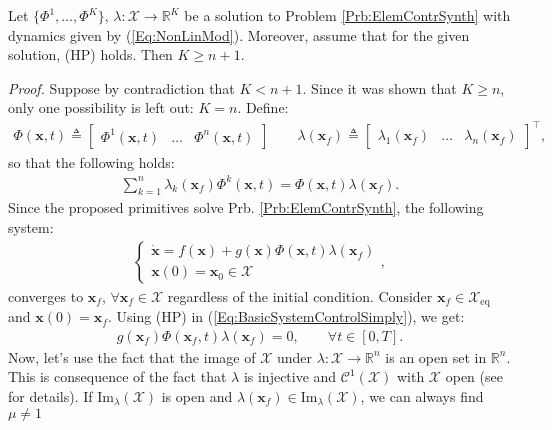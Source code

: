 \documentclass{svmult}
\newcommand{\x}{\mathbf {x}}
\newcommand{\ProofBegin}{{\em Proof.} }
\begin{document}
\begin{theorem} \label{Th:MinNumPrimNonLin}
Let $\{\Phi^1, \dots, \Phi^K\}$, $\lambda: \mathcal X \rightarrow
\mathbb R^K$ be a solution to Problem
\ref{Prb:ElemContrSynth} with dynamics given by
(\ref{Eq:NonLinMod}). Moreover, assume that for the
given solution, (HP) holds. Then $K \geq n+1$.
\end{theorem}

\ProofBegin Suppose by contradiction that $K < n + 1$. Since it was
shown that $K \geq n$, only one possibility is left out:
$K=n$. Define:
\begin{eqnarray}
\varPhi(\x, t) \triangleq \begin{bmatrix} \Phi^1(\x, t) & \dots &
\Phi^n(\x, t) \end{bmatrix} \qquad \lambda(\x_f) \triangleq \begin{bmatrix} \lambda_1(\x_f) & \dots &
\lambda_n(\x_f) \end{bmatrix}^\top,
\end{eqnarray}
so that the following holds:
\begin{eqnarray}
\sum_{k=1}^n \lambda_k(\x_f) \Phi^k(\x, t) = \varPhi(\x, t)
\lambda(\x_f).
\end{eqnarray}
Since the proposed primitives solve Prb.
\ref{Prb:ElemContrSynth}, the following system:
\begin{eqnarray} \label{Eq:BasicSystemControlSimply}
\left\{ \begin{array} {l} \mathbf {\dot x} = f (\mathbf x) +
g(\mathbf x) \varPhi(\x, t) \lambda(\x_f) \\
\mathbf x(0) = \x_0 \in \mathcal X
\end{array} \right. ,
\end{eqnarray}
converges to $\mathbf x_f$, $\forall \x_f \in \mathcal X$
regardless of the initial condition. Consider $\x_f \in \mathcal
X_{\mbox{eq}}$ and $\mathbf x(0) = \x_f$. Using (HP) in
(\ref{Eq:BasicSystemControlSimply}), we get:
\begin{eqnarray} \label{Eq:IdentNullControlAct}
g(\mathbf x_f) \varPhi(\x_f, t) \lambda(\x_f) = 0, \quad \quad
\forall t \in [0, T].
\end{eqnarray}
Now, let's use the fact that the image of $\mathcal X$ under
$\lambda: \mathcal X \rightarrow \mathbb R^n$ is an open set in $\mathbb R^n$.
This is consequence of the fact that $\lambda$ is injective and
$\mathcal C^1(\mathcal X)$ with $\mathcal X$ open (see \cite{Boothby} for details). If
$\mbox{Im}_\lambda(\mathcal X)$ is open and $\lambda(\x_f) \in
\mbox{Im}_\lambda(\mathcal X)$, we can always find $\mu \neq 1$
\end{document}
